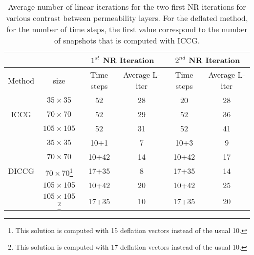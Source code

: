 \documentclass[12pt]{article}
\numberwithin{equation}{section}
\begin{document}
\begin{table}[!ht]\centering
\begin{minipage}{1\textwidth}
\vspace{-10pt}
\centering
\begin{tabular}{ |c|c|c|c|c|c|} 
  \hline
 & & \multicolumn{2}{|c|}{$1^{st}$ NR Iteration} & \multicolumn{2}{|c|}{$2^{nd}$ NR Iteration} \\
\hline
Method& size & Time steps &Average L-iter &Time steps &Average L-iter\\
\hline
&$35\times35$ &52 & 28& 20&28 \\
ICCG&$70\times70$  &52 & 29& 52&36 \\
&$105\times105$ & 52& 31& 52& 41\\
\hline
&$35\times35$ &10+1 &7 &10+3 & 9\\
&$70\times70$ &10+42 & 14& 10+42& 17\\
DICCG&$70\times70$\footnote{This solution is computed with 15 deflation vectors instead of the usual 10.} 
&17+35 & 8& 17+35& 14\\
&$105\times105$ & 10+42 & 20&10+42 & 25\\
&$105\times105$\footnote{This solution is computed with 17 deflation vectors instead of the usual 10.}  
& 17+35& 10& 17+35& 20\\
 \hline
 \end{tabular}
\caption{Average number of linear iterations for the two first NR iterations for various contrast between permeability layers. For the deflated method, for the number of time steps, the first value correspond to the number of snapshots that is computed with ICCG.}\label{table:liter70}
\end{minipage}
\end{table}
\end{document}
